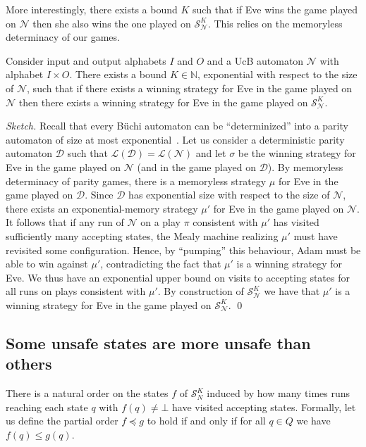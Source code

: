 \documentclass[runningheads,a4paper,draft]{llncs}
\newcommand{\eve}{Eve\xspace}
\newcommand{\adam}{Adam\xspace}
\newcommand{\calN}{\mathcal{N}}
\newcommand{\calS}{\mathcal{S}}
\newcommand{\calD}{\mathcal{D}}
\newcommand{\lang}[1]{\mathcal{L}({#1})}
\begin{document}
More interestingly, there exists a bound $K$ such that if \eve wins
the game played on $\calN$ then she also wins the one played on
$\calS^K_\calN$.  This relies on the memoryless determinacy of our games.
%
\begin{lemma}\label{lem:converse}
    Consider input and output alphabets $I$ and $O$ and a UcB automaton
    $\calN$ with alphabet $I \times O$. There exists a bound $K \in
    \mathbb{N}$, exponential with respect to the size of $\calN$, such that if
    there exists a winning strategy for \eve in the game played on $\calN$
    then there exists a winning strategy for \eve in the game played on
    $\calS^K_\calN$.
\end{lemma}
\begin{proof}[Sketch]
  Recall that every B\"uchi automaton can be ``determinized'' into a parity
  automaton of size at most exponential~\cite{safra88,piterman07}.  Let us
  consider a deterministic parity automaton $\calD$ such that
  $\lang{\calD} = \lang{\calN}$ and let $\sigma$ be the winning strategy for \eve in
  the game played on $\calN$ (and in the game played on $\calD$). By memoryless
  determinacy of parity games, there is a memoryless strategy $\mu$ for \eve in
  the game played on $\calD$. Since $\calD$ has exponential size with respect to
  the size of $\calN$, there exists an exponential-memory strategy $\mu'$ for \eve
  in the game played on $\calN$. It follows that if any run of $\calN$ on a play
  $\pi$ consistent with $\mu'$ has visited sufficiently many accepting states, the
  Mealy machine realizing $\mu'$ must have revisited some configuration. Hence, by
  ``pumping'' this behaviour, \adam must be able to win against $\mu'$,
  contradicting the fact that $\mu'$ is a winning strategy for \eve. We thus have
  an exponential upper bound on visits to accepting states for all runs on plays
  consistent with $\mu'$. By construction of $\calS^K_\calN$ we have that $\mu'$ is
  a winning strategy for \eve in the game played on $\calS^K_\calN$.  \qed
\end{proof}

\subsection{Some unsafe states are more unsafe than others}
There is a natural order on the states $f$ of $\calS^K_N$ induced by how many
times runs reaching each state $q$ with $f(q) \neq \bot$ have visited
accepting states. Formally, let us define the partial order $f \preceq g$
to hold if and only if for all $q \in Q$ we have $f(q) \leq g(q)$.
\end{document}
